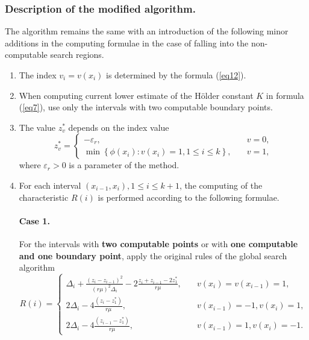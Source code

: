 \documentclass[runningheads]{llncs}
\begin{document}
\subsubsection{Description of the modified algorithm.} The algorithm remains the same with an introduction of the following minor additions in the computing formulae in the case of falling into the non-computable search regions.
\begin{enumerate} 
  \item The index $v_i=v(x_i)$ is determined by the formula (\ref{eq12}).
  \item When computing current lower estimate of the H{\"o}lder constant $K$ in formula (\ref{eq7}), use only the intervals with two computable boundary points.
  \item The value $z_v^*$ depends on the index value
\begin{equation}\label{eq20} 
z_v^*=
  \begin{cases}
    -\varepsilon _r, & {\quad v=0 ,}\\
    \min \left\{ \phi (x_i): v(x_i)=1, 1 \leq i \leq k \right\}, & {\quad v=1 ,}
  \end{cases}
\end{equation}
where $\varepsilon _r > 0$ is a parameter of the method.

  \item For each interval $(x_{i-1}, x_i), 1 \leq i \leq k+1$, the computing of the characteristic $R(i)$ is performed according to the following formulae.
      
        \paragraph{Case 1.} For the intervals with \textbf{two computable points} or with \textbf{one computable and one boundary point}, apply the original rules of the global search algorithm
\begin{equation}\label{eq21} 
R(i)=
  \begin{cases}
     \Delta _i+\frac {{(z_i-z_{i-1})}^2}{{(r \mu)}^2 \Delta _i} - 2 \frac {z_i+z_{i-1}-2z_1^*}{r \mu}, & {\quad  v(x_i)=v(x_{i-1})=1,}\\
    2 \Delta _i-4 \frac {(z_i-z_1^*)}{r \mu}, & {\quad  v(x_{i-1})=-1, v(x_i)=1,}\\
    2 \Delta _i-4 \frac {(z_{i-1}-z_1^*)}{r \mu}, & {\quad  v(x_{i-1})=1, v(x_i)=-1.}
  \end{cases}
\end{equation}

\end{enumerate}
\end{document}
